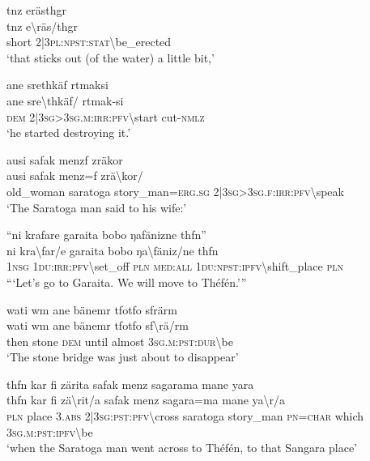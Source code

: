 \ea\label{ex:3:a7591}
tnz erästhgr\\
\gll tnz	e{\textbackslash}räs/thgr\\
     short	2|3\textsc{pl}:\textsc{npst}:\textsc{stat}{\textbackslash}be\_erected\\
\glt `that sticks out (of the water) a little bit,'
\z

\ea\label{ex:3:a7592}
ane srethkäf rtmaksi\\
\gll ane	sre{\textbackslash}thkäf/	rtmak-si\\
     \textsc{dem}	2|3\textsc{sg}>3\textsc{sg}.\textsc{m}:\textsc{irr}:\textsc{pfv}{\textbackslash}start	cut-\textsc{nmlz}\\
\glt `he started destroying it.'
\z

\ea\label{ex:3:a7594}
ausi safak menzf zräkor\\
\gll ausi	safak	menz=f	zrä{\textbackslash}kor/\\
     old\_woman	saratoga	story\_man=\textsc{erg}.\textsc{sg}	2|3\textsc{sg}>3\textsc{sg}.\textsc{f}:\textsc{irr}:\textsc{pfv}{\textbackslash}speak\\
\glt `The Saratoga man said to his wife:'
\z

\ea\label{ex:3:a7595}
``ni krafare garaita bobo ŋafänizne thfn''\\
\gll ni	kra{\textbackslash}far/e	garaita	bobo	ŋa{\textbackslash}fäniz/ne	thfn\\
     1\textsc{nsg}	1\textsc{du}:\textsc{irr}:\textsc{pfv}{\textbackslash}set\_off	\textsc{pln}	\textsc{med}:\textsc{all}	1\textsc{du}:\textsc{npst}:\textsc{ipfv}{\textbackslash}shift\_place	\textsc{pln}\\
\glt ```Let's go to Garaita. We will move to Théfén.'''
\z

\ea\label{ex:3:a7597}
wati wm ane bänemr tfotfo sfrärm\\
\gll wati	wm	ane	bänemr	tfotfo	sf{\textbackslash}rä/rm\\
     then	stone	\textsc{dem}	until	almost	3\textsc{sg}.\textsc{m}:\textsc{pst}:\textsc{dur}{\textbackslash}be\\
\glt `The stone bridge was just about to disappear'
\z

\ea\label{ex:3:a7599}
thfn kar fi zärita safak menz sagarama mane yara\\
\gll thfn	kar	fi	zä{\textbackslash}rit/a	safak	menz	sagara=ma	mane	ya{\textbackslash}r/a\\
     \textsc{pln}	place	3.\textsc{abs}	2|3\textsc{sg}:\textsc{pst}:\textsc{pfv}{\textbackslash}cross	saratoga	story\_man	\textsc{pn}=\textsc{char}	which	3\textsc{sg}.\textsc{m}:\textsc{pst}:\textsc{ipfv}{\textbackslash}be\\
\glt `when the Saratoga man went across to Théfén, to that Sangara place'
\z

